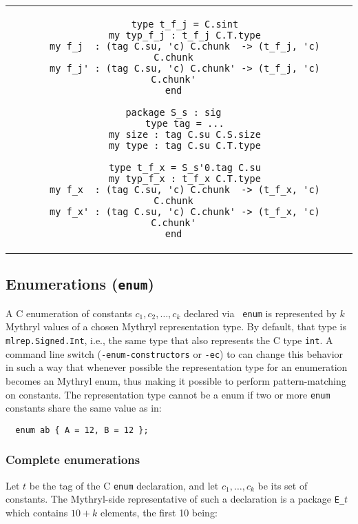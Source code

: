 \begin{small}
\begin{center}
\begin{tabular}{c|c}
\begin{minipage}{4in}
\begin{verbatim}
    type t_f_j = C.sint
    my typ_f_j : t_f_j C.T.type
    my f_j  : (tag C.su, 'c) C.chunk  -> (t_f_j, 'c) C.chunk
    my f_j' : (tag C.su, 'c) C.chunk' -> (t_f_j, 'c) C.chunk'
end

package S_s : sig
    type tag = ...
    my size : tag C.su C.S.size
    my type : tag C.su C.T.type

    type t_f_x = S_s'0.tag C.su
    my typ_f_x : t_f_x C.T.type
    my f_x  : (tag C.su, 'c) C.chunk  -> (t_f_x, 'c) C.chunk
    my f_x' : (tag C.su, 'c) C.chunk' -> (t_f_x, 'c) C.chunk'
end

\end{verbatim}
\end{minipage}  
\end{tabular}
\end{center}
\end{small}

\subsection{Enumerations ({\tt enum})}

A C enumeration of constants $c_1, c_2, \ldots, c_k$ declared via {\tt
  enum} is represented by $k$ Mythryl values of a chosen Mythryl representation
type.  By default, that type is {\tt mlrep.Signed.Int}, i.e., the same
type that also represents the C type {\tt int}.  A command line switch
({\tt -enum-constructors} or {\tt -ec}) to {\cgluemaker} can change this
behavior in such a way that whenever possible the representation type
for an enumeration becomes an Mythryl enum, thus making it possible to
perform pattern-matching on constants.  The representation type cannot be a
enum if two or more {\tt enum} constants share the same value as in:

\begin{verbatim}
  enum ab { A = 12, B = 12 };
\end{verbatim}

\subsubsection*{Complete enumerations}

Let $t$ be the tag of the C {\tt enum} declaration, and let
$c_1,\ldots,c_k$ be its set of constants.  The Mythryl-side representative
of such a declaration is a package {\tt E\_$t$} which contains $10+k$
elements, the first 10 being:

